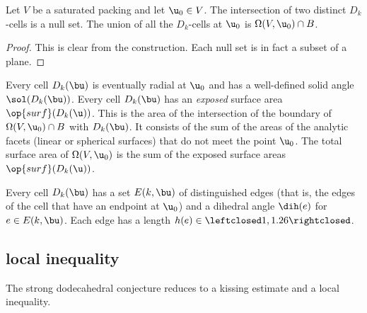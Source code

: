 \begin{lemma}[]
  Let $V$ be a saturated packing and let $\u_0\in V$.  The
  intersection of two distinct $D_k$-cells is a null set.  The union
  of all the $D_k$-cells at $\u_0$ is $\Omega(V, \u_0)\cap B$.
\end{lemma}
%

\begin{proof} This is clear from the construction.  Each null set is
  in fact a subset of a plane.
\end{proof}

Every cell $D_k(\bu)$ is eventually radial at $ \u_0$ and has a
well-defined solid angle $\sol(D_k(\bu))$.  Every cell $D_k(\bu)$ has
an {\it exposed} surface area $\op{surf}(D_k(\u))$.  This is the area
of the intersection of the boundary of $\Omega(V, \u_0)\cap B$ with
$D_k(\bu)$.  It consists of the sum of the areas of the analytic
facets (linear or spherical surfaces) that do not meet the point $
\u_0$.  The total surface area of $\Omega(V,\u_0)$ is the sum of the
exposed surface areas $\op{surf}(D_k(\u))$.  %
%
%
%


Every cell $D_k(\bu)$ has a set $E(k,\bu)$ of distinguished edges
(that is, the edges of the cell that have an endpoint at $\u_0$) and a
dihedral angle $\dih(e)$ for $e\in E(k,\bu)$.  Each edge has a length
$h(e)\in\leftclosed1,1.26\rightclosed$.  %
%
%
%

\subsection{local inequality}

The strong dodecahedral conjecture reduces to a kissing estimate and a
local inequality.  %


